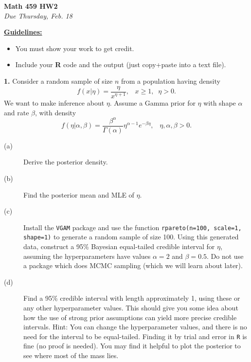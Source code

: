 \documentclass[12pt]{article}
\begin{document}
\vspace{-2cm}
\begin{center}
{\large \bf Math 459 HW2} \\
{\it Due Thursday, Feb. 18} \\
\end{center}

\noindent
\textbf{\underline{Guidelines:}}
\begin{itemize}
\item You must show your work to get credit.
\item Include your \textbf{R} code and the output (just copy+paste into a text file).
\end{itemize}


\textbf{1.} Consider a random sample of size $n$ from a population having density
\[
f(x | \eta)= \frac{\eta}{x^{\eta+1}}, \;\;\; x \geq 1, \;\; \eta > 0 .
\]
We want to make inference about $\eta$. Assume a Gamma prior for $\eta$ with shape $\alpha$ and rate $\beta$, with density
\[
f(\eta | \alpha, \beta)=\frac{\beta^{\alpha}}{\Gamma(\alpha)}\eta^{\alpha-1}e^{-\beta \eta}, \;\;\;  \eta, \alpha, \beta > 0.
\]
\begin{description}
\item[(a)] Derive the posterior density. 
\item[(b)] Find the posterior mean and MLE of $\eta$.
\item[(c)] Install the \texttt{VGAM} package and use the function \texttt{rpareto(n=100, scale=1, shape=1)} to generate a random sample of size 100. Using this generated data, construct a 95\% Bayesian equal-tailed credible interval for $\eta$, assuming the hyperparameters have values $\alpha=2$ and $\beta=0.5$. Do not use a package which does MCMC sampling (which we will learn about later).
\item[(d)] Find a 95\% credible interval with length approximately 1, using these or any other hyperparameter values. This should give you some idea about how the use of strong prior assumptions can yield more precise credible intervals. Hint: You can change the hyperparameter values, and there is no need for the interval to be equal-tailed. Finding it by trial and error in \texttt{R} is fine (no proof is needed). You may find it helpful to plot the posterior to see where most of the mass lies. 
\end{description}
\end{document}
